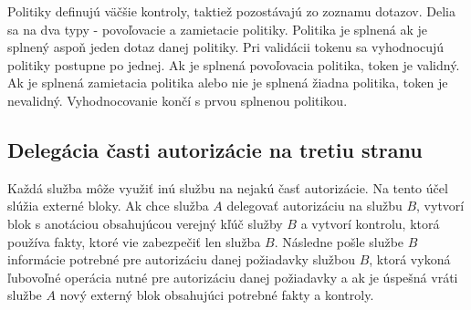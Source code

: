 Politiky definujú väčšie kontroly, taktiež pozostávajú zo zoznamu dotazov. Delia sa na dva typy - povoľovacie a zamietacie politiky. Politika je splnená ak je splnený aspoň jeden dotaz danej politiky. Pri validácii tokenu sa vyhodnocujú politiky postupne po jednej. Ak je splnená povoľovacia politika, token je validný. Ak je splnená zamietacia politika alebo nie je splnená žiadna politika, token je nevalidný. Vyhodnocovanie končí s prvou splnenou politikou.

\subsection{Delegácia časti autorizácie na tretiu stranu}

Každá služba môže využiť inú službu na nejakú časť autorizácie. Na tento účel slúžia externé bloky. Ak chce služba $A$ delegovať autorizáciu na službu $B$, vytvorí blok s anotáciou obsahujúcou verejný kľúč služby $B$ a vytvorí kontrolu, ktorá používa fakty, ktoré vie zabezpečiť len služba $B$. Následne pošle službe $B$ informácie potrebné pre autorizáciu danej požiadavky službou $B$, ktorá vykoná ľubovoľné operácia nutné pre autorizáciu danej požiadavky a ak je úspešná vráti službe $A$ nový externý blok obsahujúci potrebné fakty a kontroly. 